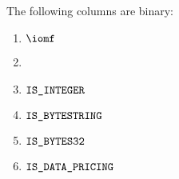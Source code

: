 The following columns are binary:
\begin{multicols}{3}
	\begin{enumerate}
		\item $\iomf$
		\item[\vspace{\fill}]
		\item $\texttt{IS\_INTEGER}$
		\item $\texttt{IS\_BYTESTRING}$
		\item $\texttt{IS\_BYTES32}$
		\item $\texttt{IS\_DATA\_PRICING}$
	\end{enumerate}
\end{multicols}
